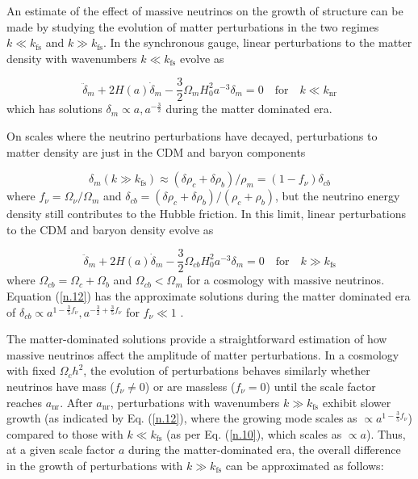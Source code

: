 An estimate of the effect of massive neutrinos on the growth of structure can be made by studying the evolution of matter perturbations in the two regimes $k \ll k_{\mathrm{fs}}$ and $k \gg k_{\mathrm{fs}}$. In the synchronous gauge, linear perturbations to the matter density with wavenumbers $k \ll k_{\mathrm{fs}}$ evolve as

\begin{equation}
    \ddot{\delta}_{m}+2 H(a) \dot{\delta}_{m}-\frac{3}{2} \Omega_{m} H_{0}^{2} a^{-3} \delta_{m}=0 \quad \text{for} \quad k \ll k_{\mathrm{nr}} \label{n.10}
\end{equation}
which has solutions $\delta_{m} \propto a, a^{-\frac{3}{2}}$ during the matter dominated era.

On scales where the neutrino perturbations have decayed, perturbations to matter density are just in the CDM and baryon components

\begin{equation}
    \delta_{m}(k \gg k_{\mathrm{fs}}) \approx (\delta \rho_{c} + \delta \rho_{b}) / \rho_{m} = (1 - f_{\nu}) \delta_{c b} \label{n.11}
\end{equation}
where $f_{\nu} = \Omega_{\nu} / \Omega_{m}$ and $\delta_{c b} = (\delta \rho_{c} + \delta \rho_{b}) / (\rho_{c} + \rho_{b})$, but the neutrino energy density still contributes to the Hubble friction. In this limit, linear perturbations to the CDM and baryon density evolve as

\begin{equation}
    \ddot{\delta}_{m}+2 H(a) \dot{\delta}_{m}-\frac{3}{2} \Omega_{c b} H_{0}^{2} a^{-3} \delta_{m}=0 \quad \text{for} \quad k \gg k_{\mathrm{fs}} \label{n.12}
\end{equation}
where $\Omega_{c b} = \Omega_{c} + \Omega_{b}$ and $\Omega_{c b} < \Omega_{m}$ for a cosmology with massive neutrinos. Equation (\ref{n.12}) has the approximate solutions during the matter dominated era of $\delta_{c b} \propto a^{1 - \frac{3}{5} f_{\nu}}, a^{-\frac{3}{2} + \frac{3}{5} f_{\nu}}$ for $f_{\nu} \ll 1$ \cite{LESGOURGUES_2006}.

The matter-dominated solutions provide a straightforward estimation of how massive neutrinos affect the amplitude of matter perturbations. In a cosmology with fixed $\Omega_{c} h^{2}$, the evolution of perturbations behaves similarly whether neutrinos have mass ($f_{\nu} \neq 0$) or are massless ($f_{\nu} = 0$) until the scale factor reaches $a_{\mathrm{nr}}$. After $a_{\mathrm{nr}}$, perturbations with wavenumbers $k \gg k_{\mathrm{fs}}$ exhibit slower growth (as indicated by Eq. (\ref{n.12}), where the growing mode scales as $\propto a^{1 - \frac{3}{5} f_{\nu}}$) compared to those with $k \ll k_{\mathrm{fs}}$ (as per Eq. (\ref{n.10}), which scales as $\propto a$). Thus, at a given scale factor $a$ during the matter-dominated era, the overall difference in the growth of perturbations with $k \gg k_{\mathrm{fs}}$ can be approximated as follows:


